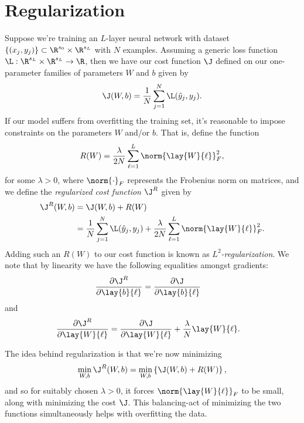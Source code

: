 

\section{Regularization}

Suppose we're training an $L$-layer neural network with dataset $\{(x_j,y_j)\}\subset\R^{s_0}\times\R^{s_L}$ with $N$ examples.  Assuming a generic loss function $\L:\R^{s_L}\times\R^{s_L}\to\R$, then we have our cost function $\J$ defined on our one-parameter families of parameters $W$ and $b$ given by
$$\J(W,b)=\frac{1}{N}\sum_{j=1}^N\L(\hat{y}_j,y_j).$$
If our model suffers from overfitting the training set, it's reasonable to impose constraints on the parameters $W$ and/or $b$.  That is, define the function
$$R(W)=\frac{\lambda}{2N}\sum_{\ell=1}^L\norm{\lay{W}{\ell}}_F^2,$$
for some $\lambda>0$, where $\norm{\cdot}_F$ represents the Frobenius norm on matrices, and we define the \textit{regularized cost function} $\J^R$ given by
\begin{align*}
	\J^R(W,b)&=\J(W,b)+R(W)\\
	&=\frac{1}{N}\sum_{j=1}^N\L(\hat{y}_j,y_j)+\frac{\lambda}{2N}\sum_{\ell=1}^L\norm{\lay{W}{\ell}}_F^2.
\end{align*}
Adding such an $R(W)$ to our cost function is known as \textit{$L^2$-regularization}.  We note that by linearity we have the following equalities amongst gradients:
\begin{align*}
	\frac{\partial\J^R}{\partial\lay{b}{\ell}}&=\frac{\partial\J}{\partial\lay{b}{\ell}}
\end{align*}
and
\begin{align*}
	\frac{\partial\J^R}{\partial\lay{W}{\ell}}&=\frac{\partial\J}{\partial\lay{W}{\ell}}+\frac{\lambda}{N}\lay{W}{\ell}.
\end{align*}

The idea behind regularization is that we're now minimizing
$$\min_{W,b}\J^R(W,b)=\min_{W,b}\left\{\J(W,b)+R(W)\right\},$$
and so for suitably chosen $\lambda>0$, it forces $\norm{\lay{W}{\ell}}_F$ to be small, along with minimizing the cost $\J$.  This balancing-act of minimizing the two functions simultaneously helps with overfitting the data.


